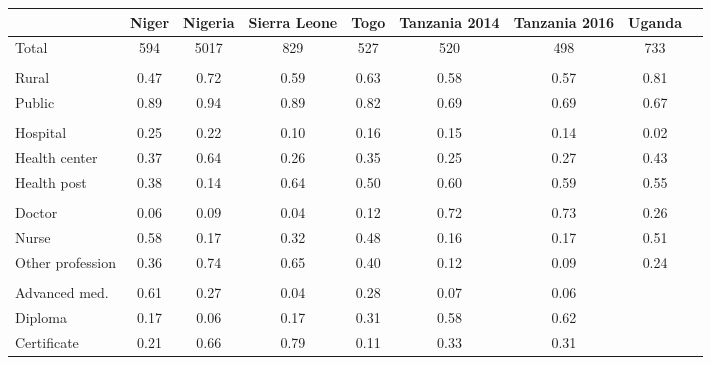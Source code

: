 \def\sym#1{\ifmmode^{#1}\else\(^{#1}\)\fi}
\begin{tabular}{l*{8}{c}}
\hline\hline
&\multicolumn{1}{c}{Niger}&\multicolumn{1}{c}{Nigeria}&\multicolumn{1}{c}{Sierra Leone}&\multicolumn{1}{c}{Togo}&\multicolumn{1}{c}{Tanzania 2014}&\multicolumn{1}{c}{Tanzania 2016}&\multicolumn{1}{c}{Uganda}&\\
\hline
Total&                                                 {594}&        {5017}&        {829}&        {527}&       {520}&       {498}&       {733}\\
  &  {}\\
Rural&                                                 {0.47}&        {0.72}&        {0.59}&        {0.63}&       {0.58}&       {0.57}&       {0.81}\\
Public&                                                {0.89}&        {0.94}&        {0.89}&        {0.82}&       {0.69}&       {0.69}&       {0.67}\\
 &   {}\\
Hospital&                                      {0.25}&        {0.22}&        {0.10}&        {0.16}&       {0.15}&       {0.14}&       {0.02}\\
Health center&                                 {0.37}&        {0.64}&        {0.26}&        {0.35}&       {0.25}&       {0.27}&       {0.43}\\
Health post&                                   {0.38}&        {0.14}&        {0.64}&        {0.50}&       {0.60}&       {0.59}&       {0.55}\\
 &   {}\\
Doctor&                                                {0.06}&        {0.09}&        {0.04}&        {0.12}&       {0.72}&       {0.73}&       {0.26}\\
Nurse&                                                 {0.58}&        {0.17}&        {0.32}&        {0.48}&       {0.16}&       {0.17}&       {0.51}\\
Other profession&                              {0.36}&        {0.74}&        {0.65}&        {0.40}&       {0.12}&       {0.09}&       {0.24}\\
&   {}\\
Advanced med.&                                 {0.61}&        {0.27}&        {0.04}&        {0.28}&       {0.07}&       {0.06}&       {}\\
Diploma&                                               {0.17}&        {0.06}&        {0.17}&        {0.31}&       {0.58}&       {0.62}&       {}\\
Certificate&                                   {0.21}&        {0.66}&        {0.79}&        {0.11}&       {0.33}&       {0.31}&       {}\\
\hline
\end{tabular}